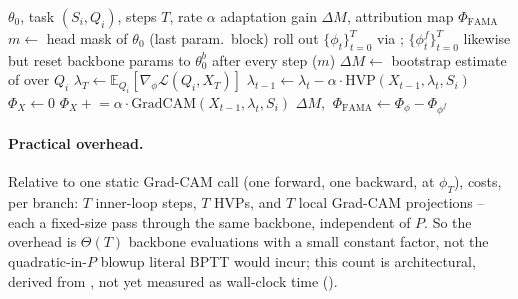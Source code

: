 \begin{algorithm}[t]
\caption{\fama}
\label{alg:fama}
\footnotesize
\begin{algorithmic}[1]
\Require $\theta_0$, task $(S_i,Q_i)$, steps $T$, rate $\alpha$
\Ensure adaptation gain $\Delta M$, attribution map $\Phi_{\mathrm{FAMA}}$
\State $m \gets$ head mask of $\theta_0$ (last param.\ block)
\State roll out $\{\phi_t\}_{t=0}^T$ via ; $\{\phi_t^f\}_{t=0}^T$ likewise but reset backbone params to $\theta_0^b$ after every step ($m$)
\State $\Delta M \gets$ bootstrap estimate of  over $Q_i$
    \State $\lambda_T \gets \mathbb{E}_{Q_i}[\nabla_\phi \mathcal{L}(Q_i, X_T)]$ 
        \State $\lambda_{t-1} \gets \lambda_t - \alpha\cdot\mathrm{HVP}(X_{t-1}, \lambda_t, S_i)$ 
    \EndFor
    \State $\Phi_X \gets 0$
        \State $\Phi_X \mathrel{+}= \alpha \cdot \mathrm{GradCAM}(X_{t-1}, \lambda_t, S_i)$ 
    \EndFor
\EndFor
\State \Return $\Delta M$, $\ \Phi_{\mathrm{FAMA}} \gets \Phi_{\phi} - \Phi_{\phi^f}$
\end{algorithmic}
\end{algorithm}

\paragraph{Practical overhead.} Relative to one static Grad-CAM call (one forward, one backward, at $\phi_T$),  costs, per branch: $T$ inner-loop steps, $T$ HVPs, and $T$ local Grad-CAM projections -- each a fixed-size pass through the same backbone, independent of $P$. So the overhead is $\Theta(T)$ backbone evaluations with a small constant factor, not the quadratic-in-$P$ blowup literal BPTT would incur; this count is architectural, derived from , not yet measured as wall-clock time ().
